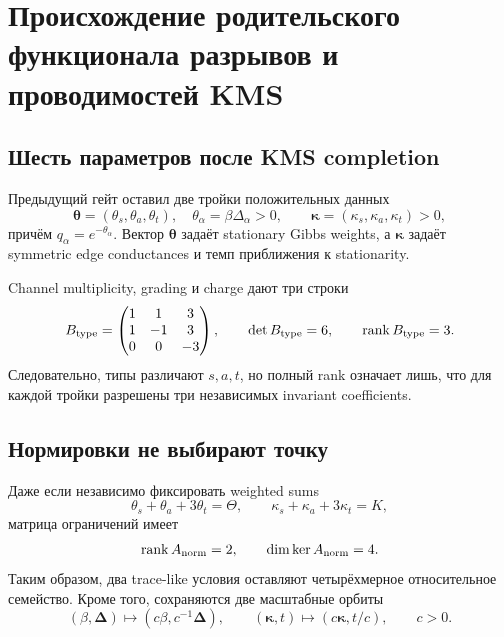 \chapter{Происхождение родительского функционала разрывов и проводимостей KMS}
\label{ch:v9-endpoint-kms-parameter-origin}

\section{Шесть параметров после KMS completion}

Предыдущий гейт оставил две тройки положительных данных
\begin{equation}
 \boldsymbol\theta=(\theta_s,\theta_a,\theta_t),
 \quad \theta_\alpha=\beta\Delta_\alpha>0,
 \qquad
 \boldsymbol\kappa=(\kappa_s,\kappa_a,\kappa_t)>0,
 \label{eq:v9-kms-origin-six-parameters}
\end{equation}
причём $q_\alpha=e^{-\theta_\alpha}$. Вектор $\boldsymbol\theta$ задаёт
stationary Gibbs weights, а $\boldsymbol\kappa$ задаёт symmetric edge
conductances и темп приближения к stationarity.

Channel multiplicity, grading и charge дают три строки
\begin{equation}
 B_{\rm type}=
 \begin{pmatrix}
 1&1&3\\
 1&-1&3\\
 0&0&-3
 \end{pmatrix},
 \qquad \det B_{\rm type}=6,
 \qquad \operatorname{rank} B_{\rm type}=3.
 \label{eq:v9-kms-origin-type-matrix}
\end{equation}
Следовательно, типы различают $s,a,t$, но полный rank означает лишь, что
для каждой тройки разрешены три независимых invariant coefficients.

\section{Нормировки не выбирают точку}

Даже если независимо фиксировать weighted sums
\begin{equation}
 \theta_s+\theta_a+3\theta_t=\Theta,
 \qquad
 \kappa_s+\kappa_a+3\kappa_t=K,
 \label{eq:v9-kms-origin-two-normalizations}
\end{equation}
матрица ограничений имеет
\begin{equation}
 \operatorname{rank} A_{\rm norm}=2,
 \qquad
 \dim\ker A_{\rm norm}=4.
 \label{eq:v9-kms-origin-normalized-freedom}
\end{equation}
Таким образом, два trace-like условия оставляют четырёхмерное относительное
семейство. Кроме того, сохраняются две масштабные орбиты
\begin{equation}
 (\beta,\boldsymbol\Delta)\mapsto
 (c\beta,c^{-1}\boldsymbol\Delta),
 \qquad
 (\boldsymbol\kappa,t)\mapsto(c\boldsymbol\kappa,t/c),
 \qquad c>0.
 \label{eq:v9-kms-origin-scale-orbits}
\end{equation}

